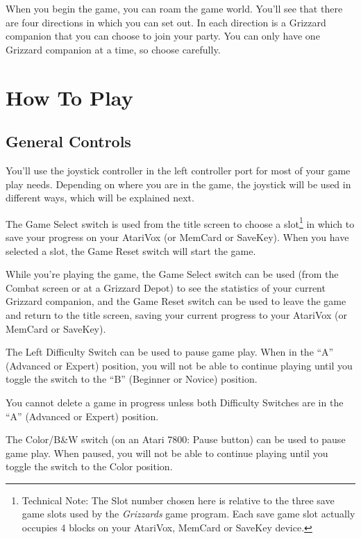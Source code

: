 \documentclass[12pt,twoside,openright,book]{memoir}
\begin{document}
\else

When you begin  the game, you can  roam the game world.  You'll see that
there are four directions in which you can set out. In each direction is
a Grizzard  companion that you  can choose to  join your party.  You can
only have one Grizzard companion at a time, so choose carefully.

\fi

\chapter{How To Play}

\section{General Controls}

You'll use the joystick controller in  the left controller port for most
of your  game play needs.  Depending on where you  are in the  game, the
joystick will be used in different ways, which will be explained next.

The  Game  Select  switch  is  used from  the  title  screen  to  choose
a slot\footnote{Technical Note: The Slot  number chosen here is relative
  to  the three  save game  slots  used by  the \textit{Grizzards}  game
  program.  Each save  game  slot  actually occupies  4  blocks on  your
  AtariVox, MemCard or  SaveKey device.} in which to  save your progress
on your AtariVox (or MemCard or SaveKey). When you have selected a slot,
the Game Reset switch will start the game.

While you're playing the game, the Game Select switch can be used (from the
Combat screen or at a Grizzard Depot) to see the statistics of your current
Grizzard companion, and the Game Reset switch can be used to leave the game
and return to the title screen, saving your current progress to your
AtariVox (or MemCard or SaveKey).

\ifdefined\TVSECAM

The Left Difficulty Switch  can be used to pause game  play. When in the
``A'' (Advanced  or Expert) position, you  will not be able  to continue
playing  until  you  toggle  the   switch  to  the  ``B''  (Beginner  or
Novice) position.

You cannot delete a game in progress unless both Difficulty Switches are
in the ``A'' (Advanced or Expert) position.

\else

The Color/B\&W  switch (on an Atari  7800: Pause button) can  be used to
pause game play.  When paused, you will not be  able to continue playing
until you toggle the switch to the Color position.
\end{document}
